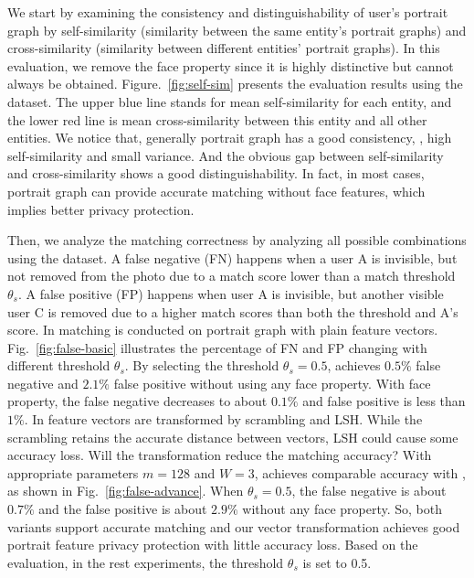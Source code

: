 We start by examining the consistency and distinguishability of user's
portrait graph
 by self-similarity (similarity between the same entity's portrait graphs)
 and cross-similarity (similarity between different entities' portrait graphs).
In this evaluation, we remove the face property since it is highly distinctive
 but cannot always be obtained.
Figure.~\ref{fig:self-sim} presents the evaluation results using the dataset.
The upper blue line stands for mean self-similarity for each entity,
 and the lower red line is mean cross-similarity between this entity
 and all other entities.
We notice that, generally portrait graph has a good consistency, \ie,
high self-similarity and small variance.
And the obvious gap between self-similarity and cross-similarity
 shows a good distinguishability.
In fact, in most cases, portrait graph can provide accurate matching
 without face features,  which implies better privacy protection.


Then, we analyze the matching correctness by analyzing all possible combinations using the dataset.
A false negative (FN) happens when a user A is invisible, but not removed from the photo
due to a match score lower than a match threshold $\theta_s$.
A false positive (FP) happens when user A is invisible, but another visible user C is removed due to
 a higher match scores than both the threshold and A's score.
In \basic matching is conducted on portrait graph with plain feature vectors.
Fig.~\ref{fig:false-basic} illustrates the  percentage of
FN and FP changing with different threshold $\theta_s$.
By selecting the threshold $\theta_s=0.5$,
 \basic achieves $0.5\%$ false negative and $2.1\%$ false
 positive without using any face property.
With face property, the false negative decreases to about $0.1\%$ and
false positive is less than $1\%$.
In \advanced feature vectors are transformed by scrambling and LSH.
While the scrambling retains the accurate distance between vectors,
LSH could cause some accuracy loss.
Will the transformation reduce the matching accuracy?
With appropriate parameters $m=128$ and $W=3$,
\advanced achieves comparable accuracy with \basic, as shown in
Fig.~\ref{fig:false-advance}.
When  $\theta_s=0.5$,
 the false negative is about $0.7\%$ and the false positive is about
 $2.9\%$ without any face property.
So, both variants support accurate matching and our vector transformation achieves good portrait feature privacy
 protection with little accuracy loss.
Based on the evaluation, in the rest experiments,
 the threshold $\theta_s$ is set to 0.5.















